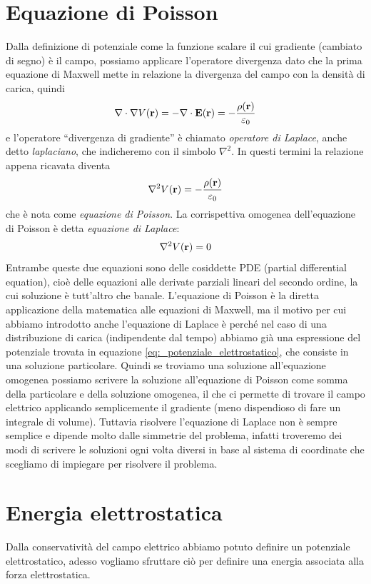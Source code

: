\section{Equazione di Poisson}
Dalla definizione di potenziale come la funzione scalare il cui gradiente (cambiato di segno) è il campo, possiamo applicare l'operatore divergenza dato che 
la prima equazione di Maxwell mette in relazione la divergenza del campo con la densità di carica, quindi
\begin{align}
  \nabla \cdot \nabla V(\mathbf{r}) = - \nabla \cdot \mathbf{E(r)} = -\frac{\rho(\mathbf{r})}{\varepsilon_0}
\end{align}
e l'operatore ``divergenza di gradiente'' è chiamato \textit{operatore di Laplace}, anche detto \textit{laplaciano}, che indicheremo con il simbolo 
$ \nabla^2 $. In questi termini la relazione appena ricavata diventa 
\begin{align}
  \nabla^2 V(\mathbf{r}) = -\frac{\rho(\mathbf{r})}{\varepsilon_0}
\end{align}
che è nota come \textit{equazione di Poisson}. La corrispettiva omogenea dell'equazione di Poisson è detta \textit{equazione di Laplace}:
\begin{align}
  \nabla^2V(\mathbf{r}) = 0
\end{align}
Entrambe queste due equazioni sono delle cosiddette PDE (partial differential equation), cioè delle equazioni alle derivate parziali lineari del secondo 
ordine, la cui soluzione è tutt'altro che banale. L'equazione di Poisson è la diretta applicazione della matematica alle equazioni di Maxwell, ma 
il motivo per cui abbiamo introdotto anche l'equazione di Laplace è perché nel caso di una distribuzione di carica (indipendente dal tempo) abbiamo già 
una espressione del potenziale trovata in equazione \eqref{eq:_potenziale_elettrostatico}, che consiste in una soluzione particolare. Quindi se troviamo 
una soluzione all'equazione omogenea possiamo scrivere la soluzione all'equazione di Poisson come somma della particolare e della soluzione omogenea, il 
che ci permette di trovare il campo elettrico applicando semplicemente il gradiente (meno dispendioso di fare un integrale di volume). Tuttavia risolvere 
l'equazione di Laplace non è sempre semplice e dipende molto dalle simmetrie del problema, infatti troveremo dei modi di scrivere le soluzioni ogni volta 
diversi in base al sistema di coordinate che scegliamo di impiegare per risolvere il problema.

\section{Energia elettrostatica}
Dalla conservatività del campo elettrico abbiamo potuto definire un potenziale elettrostatico, adesso vogliamo sfruttare ciò per definire una energia 
associata alla forza elettrostatica.

